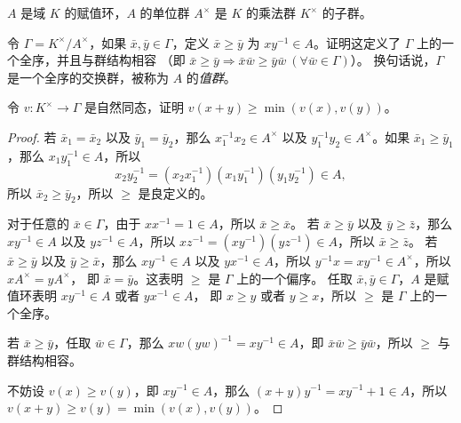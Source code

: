 \begin{problem}
  $A$ 是域 $K$ 的赋值环，$A$ 的单位群 $A^\times$ 是 $K$ 的乘法群 $K^\times$ 的子群。
  
  令 $\Gamma=K^\times/A^\times$，如果 $\bar x,\bar y\in\Gamma$，定义 $\bar x\geq \bar y$
  为 $xy^{-1}\in A$。证明这定义了 $\Gamma$ 上的一个全序，并且与群结构相容
  （即 $\bar x\geq \bar y\Rightarrow \bar x\bar w\geq \bar y\bar w\ (\forall\bar w\in\Gamma)$）。
  换句话说，$\Gamma$ 是一个全序的交换群，被称为 $A$ 的\emph{值群}。

  令 $v:K^\times \to\Gamma$ 是自然同态，证明 $v(x+y)\geq\min(v(x),v(y))$。
\end{problem}
\begin{proof}
  若 $\bar x_1=\bar x_2$ 以及 $\bar y_1=\bar y_2$，那么 $x_1^{-1}x_2\in A^\times$ 以及
  $y_1^{-1}y_2\in A^\times$。如果 $\bar x_1\geq \bar y_1$，那么
  $x_1y_1^{-1}\in A$，所以
  \[
    x_2y_2^{-1}=(x_2x_1^{-1})(x_1y_1^{-1})(y_1y_2^{-1})\in A,
  \]
  所以 $\bar x_2\geq \bar y_2$，所以 $\geq$ 是良定义的。
  
  对于任意的 $\bar x\in\Gamma$，由于 $xx^{-1}=1\in A$，所以 $\bar x\geq \bar x$。
  若 $\bar x\geq\bar y$ 以及 $\bar y\geq \bar z$，那么 $xy^{-1}\in A$ 以及
  $yz^{-1}\in A$，所以 $xz^{-1}=(xy^{-1})(yz^{-1})\in A$，所以 $\bar x\geq\bar z$。
  若 $\bar x\geq\bar y$ 以及 $\bar y\geq \bar x$，那么 $xy^{-1}\in A$ 以及
  $yx^{-1}\in A$，所以 $y^{-1}x=xy^{-1}\in A^\times$，所以 $x A^\times=yA^\times$，
  即 $\bar x=\bar y$。这表明 $\geq$ 是 $\Gamma$ 上的一个偏序。
  任取 $\bar x,\bar y\in\Gamma$，$A$ 是赋值环表明 $xy^{-1}\in A$ 或者 $yx^{-1}\in A$，
  即 $x\geq y$ 或者 $y\geq x$，所以 $\geq$ 是 $\Gamma$ 上的一个全序。

  若 $\bar x\geq \bar y$，任取 $\bar w\in\Gamma$，那么 $xw(yw)^{-1}=xy^{-1}\in A$，即
  $\bar x\bar w\geq \bar y\bar w$，所以 $\ge$ 与群结构相容。

  不妨设 $v(x)\geq v(y)$，即 $xy^{-1}\in A$，那么 $(x+y)y^{-1}=xy^{-1}+1\in A$，所以
  $v(x+y)\geq v(y)=\min(v(x),v(y))$。
\end{proof}


